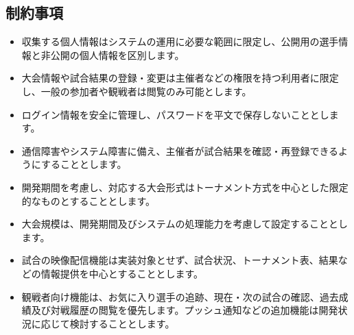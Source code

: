 \subsection{制約事項}
\begin{itemize}
  \item 収集する個人情報はシステムの運用に必要な範囲に限定し、公開用の選手情報と非公開の個人情報を区別します。
  \item 大会情報や試合結果の登録・変更は主催者などの権限を持つ利用者に限定し、一般の参加者や観戦者は閲覧のみ可能とします。
  \item ログイン情報を安全に管理し、パスワードを平文で保存しないこととします。
  \item 通信障害やシステム障害に備え、主催者が試合結果を確認・再登録できるようにすることとします。
  \item 開発期間を考慮し、対応する大会形式はトーナメント方式を中心とした限定的なものとすることとします。
  \item 大会規模は、開発期間及びシステムの処理能力を考慮して設定することとします。
  \item 試合の映像配信機能は実装対象とせず、試合状況、トーナメント表、結果などの情報提供を中心とすることとします。
  \item 観戦者向け機能は、お気に入り選手の追跡、現在・次の試合の確認、過去成績及び対戦履歴の閲覧を優先します。プッシュ通知などの追加機能は開発状況に応じて検討することとします。
\end{itemize}
